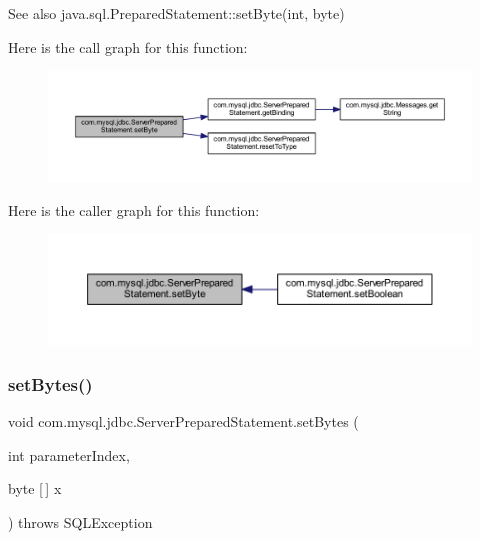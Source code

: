 \begin{DoxySeeAlso}{See also}
java.\+sql.\+Prepared\+Statement\+::set\+Byte(int, byte) 
\end{DoxySeeAlso}
Here is the call graph for this function\+:
\nopagebreak
\begin{figure}[H]
\begin{center}
\leavevmode
\includegraphics[width=350pt]{classcom_1_1mysql_1_1jdbc_1_1_server_prepared_statement_aef5f55eba055a0061bef34a3a7bef005_cgraph}
\end{center}
\end{figure}
Here is the caller graph for this function\+:
\nopagebreak
\begin{figure}[H]
\begin{center}
\leavevmode
\includegraphics[width=350pt]{classcom_1_1mysql_1_1jdbc_1_1_server_prepared_statement_aef5f55eba055a0061bef34a3a7bef005_icgraph}
\end{center}
\end{figure}
\mbox{\label{classcom_1_1mysql_1_1jdbc_1_1_server_prepared_statement_a5cedc06238d893f25f948137c182c1ba}} 
\subsubsection{\texorpdfstring{set\+Bytes()}{setBytes()}}
{\footnotesize\ttfamily void com.\+mysql.\+jdbc.\+Server\+Prepared\+Statement.\+set\+Bytes (\begin{DoxyParamCaption}\item[{int}]{parameter\+Index,  }\item[{byte \mbox{[}$\,$\mbox{]}}]{x }\end{DoxyParamCaption}) throws S\+Q\+L\+Exception}

